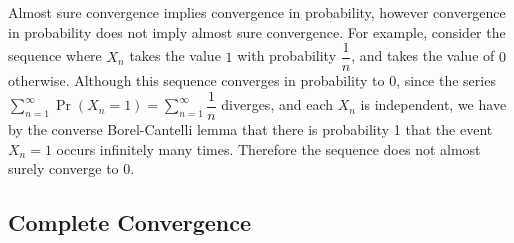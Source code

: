 \documentclass[11pt]{report} %
\begin{document}
Almost sure convergence implies convergence in probability, however convergence in probability does not imply almost sure convergence. For example, consider the sequence where $X_{n}$ takes the value $1$ with probability $\dfrac{1}{n}$, and takes the value of $0$ otherwise. Although this sequence converges in probability to $0$, since the series $\sum_{n = 1}^{\infty}\operatorname{Pr}\left(X_{n} = 1\right) = \sum_{n = 1}^{\infty}\dfrac{1}{n}$ diverges, and each $X_{n}$ is independent, we have by the converse Borel-Cantelli lemma that there is probability 1 that the event $X_{n} = 1$ occurs infinitely many times. Therefore the sequence does not almost surely converge to $0$.

\subsection{Complete Convergence}
\end{document}
